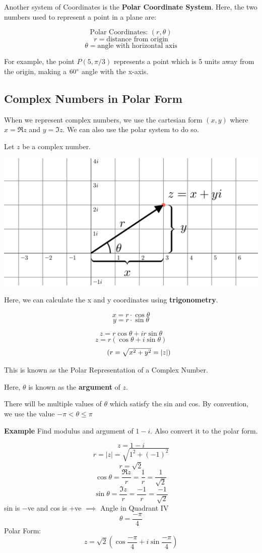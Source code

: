 \documentclass[
  14pt,
]{extarticle}
\renewenvironment{quote}{\begin{myquote}}{\end{myquote}}
\begin{document}
Another system of Coordinates is the \textbf{Polar Coordinate System}.
Here, the two numbers used to represent a point in a plane are:

\[\text{Polar Coordinates: } (r,\theta)\]
\[r=\text{distance from origin}\]
\[\theta=\text{angle with horizontal axis}\]

\begin{quote}
For example, the point \(P(5, \pi/3)\) represents a point which is 5
units away from the origin, making a \(60\degree\) angle with the
x-axis.
\end{quote}

\hypertarget{complex-numbers-in-polar-form}{%
\subsection{Complex Numbers in Polar
Form}\label{complex-numbers-in-polar-form}}

When we represent complex numbers, we use the cartesian form \((x, y)\)
where \(x=\Re z\) and \(y=\Im z\). We can also use the polar system to
do so.

Let \(z\) be a complex number.

\includegraphics{../images/2022-05-31-19-12-30.png}

Here, we can calculate the x and y coordinates using
\textbf{trigonometry}.

\[x=r\cdot\cos\theta\] \[y=r\cdot\sin\theta\]

\[z=r\cos\theta+ir\sin\theta\] \[\boxed{z=r(\cos\theta+i\sin\theta)}\]
\[\ \tag{$r=\sqrt{x^2+y^2}=|z|$}\]

This is known as the Polar Representation of a Complex Number.

Here, \(\theta\) is known as the \textbf{argument} of \(z\).

\begin{quote}
There will be multiple values of \(\theta\) which satisfy the sin and
cos. By convention, we use the value \(-\pi<\theta\le\pi\)
\end{quote}

\begin{quote}
\textbf{Example} Find modulus and argument of \(1-i\). Also convert it
to the polar form.

\[z=1-i\] \[r=|z|=\sqrt{1^2+(-1)^2}\] \[\boxed{r=\sqrt2}\]
\[\cos\theta=\frac{\Re z}r=\frac1r=\frac1{\sqrt2}\]
\[\sin\theta=\frac{\Im z}r=\frac{-1}r=\frac{-1}{\sqrt2}\] sin is \(-\)ve
and cos is +ve \(\implies\) Angle in Quadrant IV
\[\boxed{\theta = \frac{-\pi}{4}}\] Polar Form:
\[\boxed{z=\sqrt2\left(\cos\frac{-\pi}4+i\sin\frac{-\pi}4\right)}\]
\end{quote}
\end{document}
